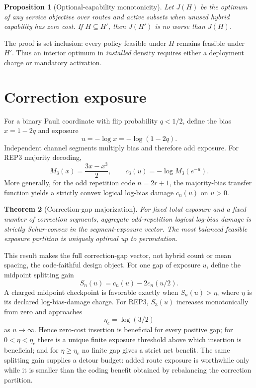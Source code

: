 \documentclass[aps,prx,reprint,superscriptaddress,nofootinbib,longbibliography,floatfix]{revtex4-2}
\newtheorem{theorem}{Theorem}\newtheorem{proposition}[theorem]{Proposition}\newtheorem{corollary}[theorem]{Corollary}
\begin{document}
\begin{proposition}[Optional-capability monotonicity]
Let $J(H)$ be the optimum of any service objective over routes and active subsets when unused hybrid capability has zero cost. If $H\subseteq H'$, then $J(H')$ is no worse than $J(H)$.
\end{proposition}
The proof is set inclusion: every policy feasible under $H$ remains feasible under $H'$. Thus an interior optimum in \emph{installed} density requires either a deployment charge or mandatory activation.

\section{Correction exposure}
For a binary Pauli coordinate with flip probability $q<1/2$, define the bias $x=1-2q$ and exposure
\begin{equation}
u=-\log x=-\log(1-2q).
\end{equation}
Independent channel segments multiply bias and therefore add exposure. For REP3 majority decoding,
\begin{equation}
M_3(x)=\frac{3x-x^3}{2},\qquad c_3(u)=-\log M_3(e^{-u}).
\end{equation}
More generally, for the odd repetition code $n=2r+1$, the majority-bias transfer function yields a strictly convex logical log-bias damage $c_n(u)$ on $u>0$.

\begin{theorem}[Correction-gap majorization]
For fixed total exposure and a fixed number of correction segments, aggregate odd-repetition logical log-bias damage is strictly Schur-convex in the segment-exposure vector. The most balanced feasible exposure partition is uniquely optimal up to permutation.
\end{theorem}

This result makes the full correction-gap vector, not hybrid count or mean spacing, the code-faithful design object. For one gap of exposure $u$, define the midpoint splitting gain
\begin{equation}
S_n(u)=c_n(u)-2c_n(u/2).
\end{equation}
A charged midpoint checkpoint is favorable exactly when $S_n(u)>\eta$, where $\eta$ is its declared log-bias-damage charge. For REP3, $S_3(u)$ increases monotonically from zero and approaches
\begin{equation}
\eta_c=\log(3/2)
\end{equation}
as $u\to\infty$. Hence zero-cost insertion is beneficial for every positive gap; for $0<\eta<\eta_c$ there is a unique finite exposure threshold above which insertion is beneficial; and for $\eta\ge\eta_c$ no finite gap gives a strict net benefit. The same splitting gain supplies a detour budget: added route exposure is worthwhile only while it is smaller than the coding benefit obtained by rebalancing the correction partition.
\end{document}
